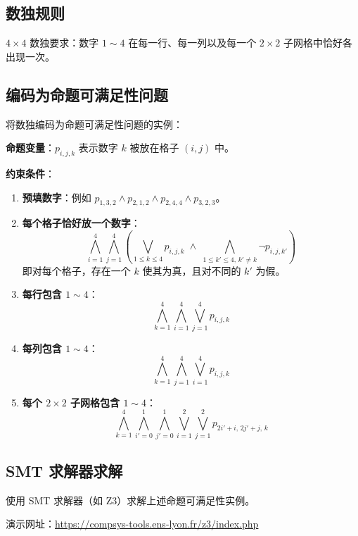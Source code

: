 \documentclass[UTF8,11pt,a4paper]{ctexbook}   %
\theoremstyle{definition}
\begin{document}
\subsection{数独规则}

$4 \times 4$ 数独要求：数字 $1 \sim 4$ 在每一行、每一列以及每一个 $2 \times 2$ 子网格中恰好各出现一次。

\subsection{编码为命题可满足性问题}

将数独编码为命题可满足性问题的实例：

\textbf{命题变量}：$p_{i,j,k}$ 表示数字 $k$ 被放在格子 $(i,j)$ 中。

\textbf{约束条件}：
\begin{enumerate}
    \item \textbf{预填数字}：例如 $p_{1,3,2} \land p_{2,1,2} \land p_{2,4,4} \land p_{3,2,3}$。
    \item \textbf{每个格子恰好放一个数字}：
    \[
    \bigwedge_{i=1}^{4} \bigwedge_{j=1}^{4} \left( \bigvee_{1 \leq k \leq 4} p_{i,j,k} \;\land\; \bigwedge_{1 \leq k' \leq 4,\, k' \neq k} \neg p_{i,j,k'} \right)
    \]
    即对每个格子，存在一个 $k$ 使其为真，且对不同的 $k'$ 为假。
    \item \textbf{每行包含 $1 \sim 4$}：
    \[
    \bigwedge_{k=1}^{4} \bigwedge_{i=1}^{4} \bigvee_{j=1}^{4} p_{i,j,k}
    \]
    \item \textbf{每列包含 $1 \sim 4$}：
    \[
    \bigwedge_{k=1}^{4} \bigwedge_{j=1}^{4} \bigvee_{i=1}^{4} p_{i,j,k}
    \]
    \item \textbf{每个 $2 \times 2$ 子网格包含 $1 \sim 4$}：
    \[
    \bigwedge_{k=1}^{4} \bigwedge_{i'=0}^{1} \bigwedge_{j'=0}^{1} \bigvee_{i=1}^{2} \bigvee_{j=1}^{2} p_{2i'+i,\, 2j'+j,\, k}
    \]
\end{enumerate}

\subsection{SMT 求解器求解}

使用 SMT 求解器（如 Z3）求解上述命题可满足性实例。

演示网址：\url{https://compsys-tools.ens-lyon.fr/z3/index.php}
\end{document}
